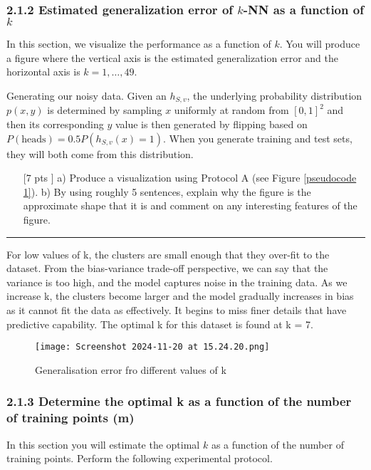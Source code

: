 \documentclass{article}
\begin{document}
\subsubsection*{2.1.2 Estimated generalization error of $k$-NN as a function of $k$}

In this section, we visualize the performance as a function of $k$. You will produce a figure where the vertical axis is the estimated generalization error and the horizontal axis is $k = 1, \ldots, 49$.

Generating our noisy data. Given an $h_{S,v}$, the underlying probability distribution $p(x, y)$ is determined by sampling $x$ uniformly at random from $[0,1]^2$ and then its corresponding $y$ value is then generated by flipping based on $P(\text{heads}) = 0.5P(h_{S,v}(x) = 1)$. When you generate training and test sets, they will both come from this distribution.

\begin{enumerate}
    \item [[7 pts]] a) Produce a visualization using Protocol A (see Figure \ref{pseudocode 1}). b) By using roughly 5 sentences, explain why the figure is the approximate shape that it is and comment on any interesting features of the figure.
\end{enumerate}

\noindent\textcolor{gray}{\rule{0.1\linewidth}{0.5pt}}

For low values of k, the clusters are small enough that they over-fit to the dataset. From the bias-variance trade-off perspective, we can say that the variance is too high, and the model captures noise in the training data. As we increase k, the clusters become larger and the model gradually increases in bias as it cannot fit the data as effectively. It begins to miss finer details that have predictive capability. The optimal k for this dataset is found at k = 7.


\begin{figure}[H]
    \centering
    \texttt{[image: Screenshot 2024-11-20 at 15.24.20.png]}
    \caption{Generalisation error fro different values of k}
    \label{fig:enter-label}
\end{figure}



\subsubsection*{2.1.3 Determine the optimal k as a function of the number of training points (m)}
In this section you will estimate the optimal \(k\) as a function of the number of training points. Perform the following experimental protocol.
\end{document}
